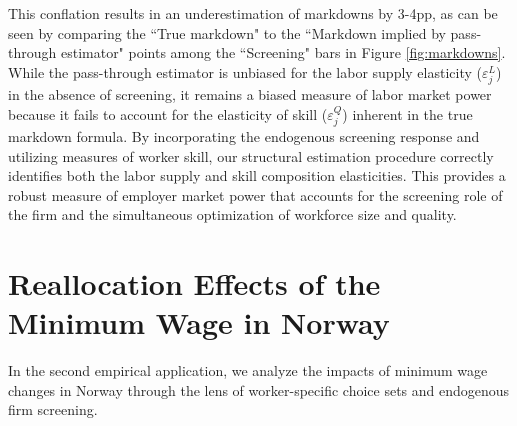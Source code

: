 \documentclass[11pt]{article}
\begin{document}
This conflation results in an underestimation of markdowns by 3-4pp, as can be seen by comparing the ``True markdown" to the ``Markdown implied by pass-through estimator" points among the ``Screening" bars in Figure \ref{fig:markdowns}. While the pass-through estimator is unbiased for the labor supply elasticity ($\varepsilon_j^L$) in the absence of screening, it remains a biased measure of labor market power because it fails to account for the elasticity of skill ($\varepsilon_j^Q$) inherent in the true markdown formula. By incorporating the endogenous screening response and utilizing measures of worker skill, our structural estimation procedure correctly identifies both the labor supply and skill composition elasticities. This provides a robust measure of employer market power that accounts for the screening role of the firm and the simultaneous optimization of workforce size and quality.  





\section{Reallocation Effects of the Minimum Wage in Norway}

In the second empirical application, we analyze the impacts of minimum wage changes in Norway through the lens of worker-specific choice sets and endogenous firm screening. %
\end{document}
